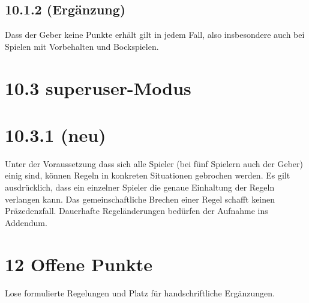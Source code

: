 \subsection*{10.1.2 (Ergänzung)}

Dass der Geber keine Punkte erhält gilt in jedem Fall, also insbesondere auch
bei Spielen mit Vorbehalten und Bockspielen.

\section*{10.3 superuser-Modus}

\section*{10.3.1 (neu)}

Unter der Voraussetzung dass sich alle Spieler (bei fünf Spielern auch der
Geber) einig sind, können Regeln in konkreten Situationen gebrochen werden. Es
gilt ausdrücklich, dass ein einzelner Spieler die genaue Einhaltung der Regeln
verlangen kann. Das gemeinschaftliche Brechen einer Regel schafft keinen
Präzedenzfall. Dauerhafte Regeländerungen bedürfen der Aufnahme ins Addendum.

\clearpage

\section*{12 Offene Punkte}

Lose formulierte Regelungen und Platz für handschriftliche Ergänzungen.

